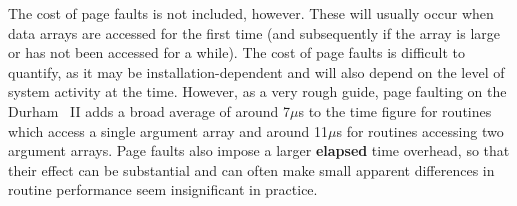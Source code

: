 The cost of page faults is not included, however.
These will usually occur when data arrays are accessed for the first time
(and subsequently if the array is large or has not been accessed for a while).
The cost of page faults is difficult to quantify, as it may be
installation-dependent and will also depend on the level of system activity
at the time. 
However, as a very rough guide, page faulting on the Durham ~II
adds a broad average of around 7$\mu$s to the  time figure for
routines which access a single  argument array and around 11$\mu$s
for routines accessing two  argument arrays.
Page faults also impose a larger {\bf elapsed} time overhead, so that their
effect can be substantial and can often make small apparent differences in
routine performance seem insignificant in practice. 

\newpage

